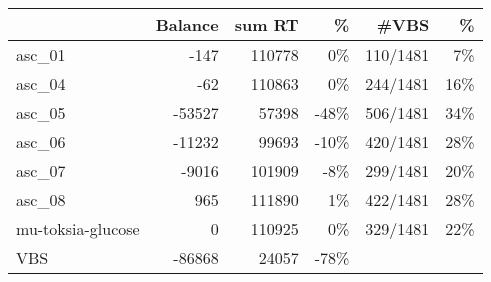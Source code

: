 \begin{tabular}{lrrrrr}
\toprule
 & Balance & sum RT &  \% & #VBS & \% \\
\midrule
asc_01 & -147 & 110778 & 0\% & 110/1481 & 7\% \\
asc_04 & -62 & 110863 & 0\% & 244/1481 & 16\% \\
asc_05 & -53527 & 57398 & -48\% & 506/1481 & 34\% \\
asc_06 & -11232 & 99693 & -10\% & 420/1481 & 28\% \\
asc_07 & -9016 & 101909 & -8\% & 299/1481 & 20\% \\
asc_08 & 965 & 111890 & 1\% & 422/1481 & 28\% \\
mu-toksia-glucose & 0 & 110925 & 0\% & 329/1481 & 22\% \\
VBS & -86868 & 24057 & -78\% &  &  \\
\bottomrule
\end{tabular}
